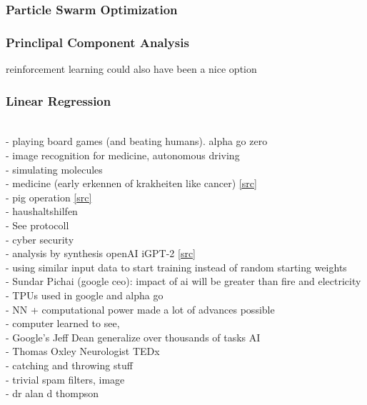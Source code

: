 \subsubsection{Particle Swarm Optimization}
%
\subsubsection{Princlipal Component Analysis}
reinforcement learning could also have been a nice option
%
\subsubsection{Linear Regression}
%
\iffalse
\clearpage
%
\\
 - playing board games (and beating humans). alpha go zero \cite{Silver2017}\\
 - image recognition for medicine\cite{Li2020,Deo2015,Topol2019}, autonomous driving \cite{Fujiyoshi2019}\\
 - simulating molecules \cite{Westermayr2019}\\
 - medicine (early erkennen of krakheiten like cancer) \href{https://med.stanford.edu/radiology/news/2020/smart-toilet.html}{[src]}\\
 - pig operation \href{https://www.science.org/doi/10.1126/scirobotics.abj2908}{[src]}\\
 - haushaltshilfen \\
 - See protocoll\\
 - cyber security\cite{Sarker2021}\\
 - analysis by synthesis openAI iGPT-2 \href{https://openai.com/blog/image-gpt/}{[src]}\\
 - using similar input data to start training instead of random starting weights\\
 - Sundar Pichai (google ceo): impact of ai will be greater than fire and electricity\\
 - TPUs used in google and alpha go \\
 - NN + computational power made a lot of advances possible\\
 - computer learned to see, \\
 - Google's Jeff Dean generalize over thousands of tasks AI\\
 - Thomas Oxley Neurologist TEDx\\
 - catching and throwing stuff \\
 - trivial spam filters, image\\
 - dr alan d thompson\\
